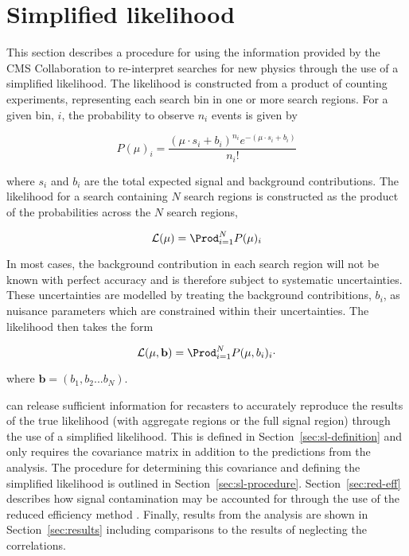 \section{Simplified likelihood}
\label{sec:simplified-likelihood}

This section describes a procedure for using the information provided by the CMS Collaboration to 
re-interpret searches for new physics through the use of a simplified likelihood. The likelihood is 
constructed from a product of counting experiments, representing each search bin in one or more search regions. 
For a given bin, $i$, the probability to observe $n_{i}$ events is given by

\begin{equation}
P(\mu)_{i} = \dfrac{(\mu \cdot s_{i}+b_{i})^{n_{i}} e^{-(\mu \cdot s_{i}+b_{i})} }{n_{i}!}
\label{eq:poisson-likelihood}
\end{equation}

where $s_{i}$ and $b_{i}$ are the total expected signal and background contributions. 
The likelihood for a search containing $N$ search regions is constructed as the product 
of the probabilities across the $N$ search regions, 

\begin{equation}
\mathcal{L}(\mu) = \Prod_{i=1}^{N} P(\mu)_{i}
\label{eq:stat-likelihood}
\end{equation}

In most cases, the background contribution in each search region will not be known with perfect accuracy and is therefore 
subject to systematic uncertainties. These uncertainties are modelled by treating the background contribitions, $b_{i}$, as 
nuisance parameters which are constrained within their uncertainties. The likelihood then takes the form

\begin{equation}
\mathcal{L}(\mu, \mathbf{b}) = \Prod_{i=1}^{N} P(\mu,b_{i})_{i} \cdot 
\label{eq:stat-likelihood}
\end{equation}

where $\mathbf{b}=(b_{1},b_{2}...b_{N})$.

can release sufficient information for recasters to 
accurately reproduce the results of the true likelihood (with aggregate regions or
the full signal region) through the use of a simplified likelihood. This is defined
in Section~\ref{sec:sl-definition} and only requires the covariance matrix
in addition to the predictions from the analysis. The procedure for determining
this covariance and defining the simplified likelihood is outlined in Section~\ref{sec:sl-procedure}.
Section~\ref{sec:red-eff} describes how signal contamination may be accounted for
through the use of the reduced efficiency method \cite{redeff}. Finally, results
from the \alphat analysis are shown in Section~\ref{sec:results} including comparisons
to the results of neglecting the correlations.


